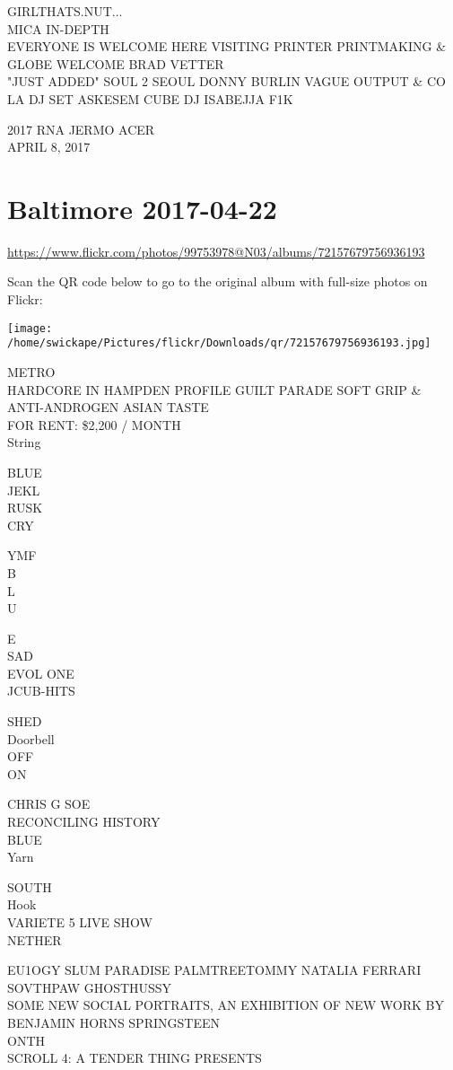 \documentclass[10pt,letterpaper]{article}
\begin{document}
GIRLTHATS.NUT...\\
MICA IN{-}DEPTH\\
EVERYONE IS WELCOME HERE VISITING PRINTER PRINTMAKING \& GLOBE WELCOME BRAD VETTER\\
"JUST ADDED" SOUL 2 SEOUL DONNY BURLIN VAGUE OUTPUT \& CO LA DJ SET ASKESEM CUBE DJ ISABEJJA F1K

2017 RNA JERMO ACER\\
APRIL 8, 2017


\section*{Baltimore 2017-04-22}

\url{https://www.flickr.com/photos/99753978@N03/albums/72157679756936193}

Scan the QR code below to go to the original album with full-size photos on Flickr:

\texttt{[image: /home/swickape/Pictures/flickr/Downloads/qr/72157679756936193.jpg]}


METRO\\
HARDCORE IN HAMPDEN PROFILE GUILT PARADE SOFT GRIP \& ANTI{-}ANDROGEN ASIAN TASTE\\
FOR RENT: \$2,200 / MONTH\\
String

BLUE\\
JEKL\\
RUSK\\
CRY

YMF\\
B\\
L\\
U

E\\
SAD\\
EVOL ONE\\
JCUB{-}HITS

SHED\\
Doorbell\\
OFF\\
ON

CHRIS G SOE\\
RECONCILING HISTORY\\
BLUE\\
Yarn

SOUTH\\
Hook\\
VARIETE 5 LIVE SHOW\\
NETHER

EU1OGY SLUM PARADISE PALMTREETOMMY NATALIA FERRARI SOVTHPAW GHOSTHUSSY\\
SOME NEW SOCIAL PORTRAITS, AN EXHIBITION OF NEW WORK BY BENJAMIN HORNS SPRINGSTEEN\\
ONTH\\
SCROLL 4: A TENDER THING PRESENTS
\end{document}
